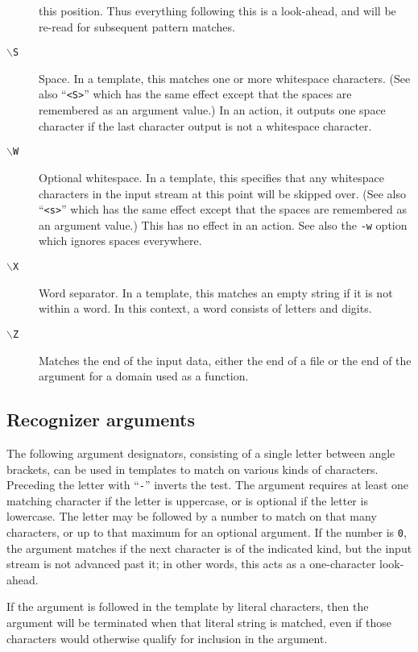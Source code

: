 \begin{description}
this position.  Thus everything following this is a look-ahead, and will
be re-read for subsequent pattern matches.
\item[{\tt $\backslash$S}]
Space.  In a template, this matches one or more whitespace characters.
(See also ``\verb/<S>/'' which has the same effect except that the
spaces are remembered as an argument value.)
In an action, it outputs one space character if the last character
output is not a whitespace character.
\item[{\tt $\backslash$W}]
Optional whitespace.  In a template, this specifies that any whitespace
characters in the input stream at this point will be skipped over.
(See also ``\verb/<s>/'' which has the same effect except that the
spaces are remembered as an argument value.)
This has no effect in an action.
See also the \verb/-w/ option which ignores spaces everywhere.
\item[{\tt $\backslash$X}]
Word separator.  In a template, this matches an empty string if it is
not within a word.  In this context, a word consists of letters and digits.
\item[{\tt $\backslash$Z}]
Matches the end of the input data, either the end of a file
or the end of the argument for a domain used as a function.
\end{description}


\subsection{Recognizer arguments}
The following argument designators, consisting of a single letter between
angle brackets, can be used in templates to match on
various kinds of characters.  Preceding the letter with
``\verb|-|''
inverts the test.  The argument requires at least one matching character
if the letter is uppercase, or is optional if the letter is lowercase.
The letter may be followed by a number to match on that many
characters, or up to that maximum for an optional argument.  If the
number is {\tt 0},
the argument matches if the next character is of the
indicated kind, but the input stream is not advanced past it; in other
words, this acts as a one-character look-ahead.

If the argument is followed in the template by literal characters, then
the argument will be terminated when that literal string is matched,
even if those characters would otherwise qualify for inclusion in the
argument.

